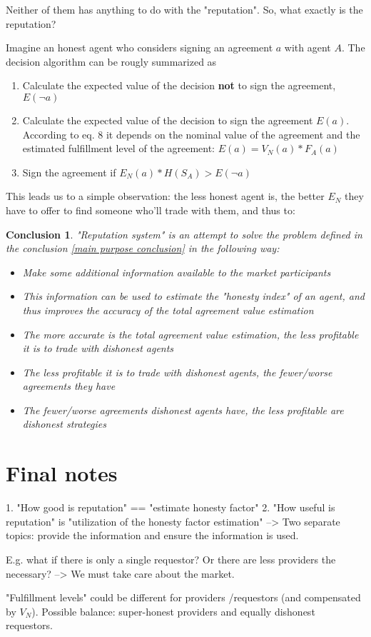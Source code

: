 \documentclass{article}
\newtheorem{conclusion}{Conclusion}[section]
\begin{document}
Neither of them has anything to do with the "reputation". So, what exactly is the reputation?

Imagine an honest agent who considers signing an agreement $a$ with agent $A$. The decision algorithm can be rougly summarized as
\begin{enumerate}
\item{Calculate the expected value of the decision \textbf{not} to sign the agreement, $E(\neg a)$}
\item{Calculate the expected value of the decision to sign the agreement $E(a)$. 
    According to eq. 8 it depends on the nominal value of the agreement 
    and the estimated fulfillment level of the agreement: $E(a) = V_N(a) * F_A(a)$}
\item{Sign the agreement if $E_N(a) * H(S_A) > E(\neg a)$}
\end{enumerate}

This leads us to a simple observation: the less honest agent is, the better $E_N$ they have to offer to find someone who'll trade with them, and thus to:

\begin{conclusion}

"Reputation system" is an attempt to solve the problem defined in the conclusion \ref{main purpose conclusion} in the following way:

\begin{itemize}
    \item{Make some additional information available to the market participants}
    \item{This information can be used to estimate the "honesty index" of an agent, and thus improves the accuracy of the total agreement value estimation}
    \item{The more accurate is the total agreement value estimation, the less profitable it is to trade with dishonest agents}
    \item{The less profitable it is to trade with dishonest agents, the fewer/worse agreements they have}
    \item{The fewer/worse agreements dishonest agents have, the less profitable are dishonest strategies}
\end{itemize}

\end{conclusion}


\section{Final notes}

1. "How good is reputation" == "estimate honesty factor"
2. "How useful is reputation" is "utilization of the honesty factor estimation"
--> Two separate topics: provide the information and ensure the information is used.

E.g. what if there is only a single requestor? Or there are less providers the necessary?
--> We must take care about the market.

"Fulfillment levels" could be different for providers /requestors (and compensated by $V_N$).
Possible balance: super-honest providers and equally dishonest requestors.
\end{document}
